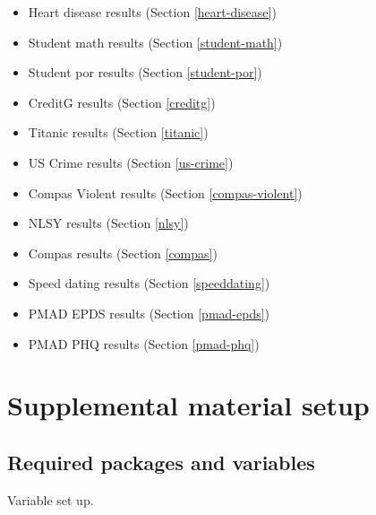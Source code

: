 \documentclass[
]{book}
\providecommand{\tightlist}{%
  \setlength{\itemsep}{0pt}\setlength{\parskip}{0pt}}
\begin{document}
\begin{itemize}
\tightlist
\item
  Heart disease results (Section \ref{heart-disease})
\item
  Student math results (Section \ref{student-math})
\item
  Student por results (Section \ref{student-por})
\item
  CreditG results (Section \ref{creditg})
\item
  Titanic results (Section \ref{titanic})
\item
  US Crime results (Section \ref{us-crime})
\item
  Compas Violent results (Section \ref{compas-violent})
\item
  NLSY results (Section \ref{nlsy})
\item
  Compas results (Section \ref{compas})
\item
  Speed dating results (Section \ref{speeddating})
\item
  PMAD EPDS results (Section \ref{pmad-epds})
\item
  PMAD PHQ results (Section \ref{pmad-phq})
\end{itemize}

\hypertarget{supplemental-material-setup}{%
\section{Supplemental material setup}\label{supplemental-material-setup}}

\hypertarget{required-packages-and-variables}{%
\subsection{Required packages and variables}\label{required-packages-and-variables}}

Variable set up.
\end{document}
